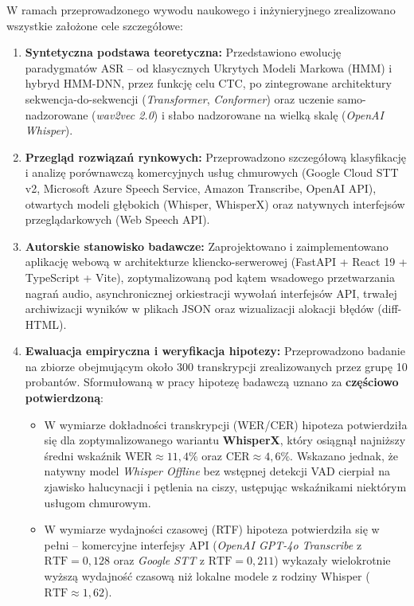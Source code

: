 W ramach przeprowadzonego wywodu naukowego i inżynieryjnego zrealizowano wszystkie założone cele szczegółowe:
\begin{enumerate}
    \item \textbf{Syntetyczna podstawa teoretyczna:} Przedstawiono ewolucję paradygmatów ASR -- od klasycznych Ukrytych Modeli Markowa (HMM) i hybryd HMM-DNN, przez funkcję celu CTC, po zintegrowane architektury sekwencja-do-sekwencji (\textit{Transformer}, \textit{Conformer}) oraz uczenie samo-nadzorowane (\textit{wav2vec 2.0}) i słabo nadzorowane na wielką skalę (\textit{OpenAI Whisper}).
    \item \textbf{Przegląd rozwiązań rynkowych:} Przeprowadzono szczegółową klasyfikację i analizę porównawczą komercyjnych usług chmurowych (Google Cloud STT v2, Microsoft Azure Speech Service, Amazon Transcribe, OpenAI API), otwartych modeli głębokich (Whisper, WhisperX) oraz natywnych interfejsów przeglądarkowych (Web Speech API).
    \item \textbf{Autorskie stanowisko badawcze:} Zaprojektowano i zaimplementowano aplikację webową w architekturze kliencko-serwerowej (FastAPI + React 19 + TypeScript + Vite), zoptymalizowaną pod kątem wsadowego przetwarzania nagrań audio, asynchronicznej orkiestracji wywołań interfejsów API, trwałej archiwizacji wyników w plikach JSON oraz wizualizacji alokacji błędów (diff-HTML).
    \item \textbf{Ewaluacja empiryczna i weryfikacja hipotezy:} Przeprowadzono badanie na zbiorze obejmującym około 300 transkrypcji zrealizowanych przez grupę 10 probantów. Sformułowaną w pracy hipotezę badawczą uznano za \textbf{częściowo potwierdzoną}:
    \begin{itemize}
        \item W wymiarze dokładności transkrypcji (WER/CER) hipoteza potwierdziła się dla zoptymalizowanego wariantu \textbf{WhisperX}, który osiągnął najniższy średni wskaźnik $\text{WER} \approx 11,4\%$ oraz $\text{CER} \approx 4,6\%$. Wskazano jednak, że natywny model \textit{Whisper Offline} bez wstępnej detekcji VAD cierpiał na zjawisko halucynacji i pętlenia na ciszy, ustępując wskaźnikami niektórym usługom chmurowym.
        \item W wymiarze wydajności czasowej (RTF) hipoteza potwierdziła się w pełni -- komercyjne interfejsy API (\textit{OpenAI GPT-4o Transcribe} z $\text{RTF} = 0,128$ oraz \textit{Google STT} z $\text{RTF} = 0,211$) wykazały wielokrotnie wyższą wydajność czasową niż lokalne modele z rodziny Whisper ($\text{RTF} \approx 1,62$).
    \end{itemize}
\end{enumerate}

